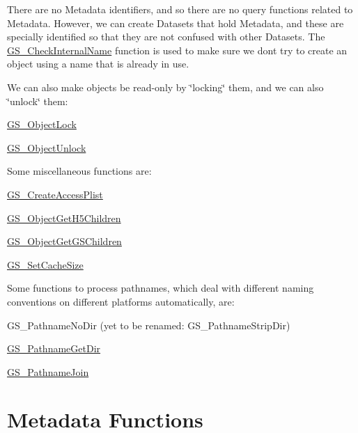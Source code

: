 There are no Metadata identifiers, and so there are no query functions related to Metadata. However, we can create Datasets that hold Metadata, and these are specially identified so that they are not confused with other Datasets. The \hyperlink{hdf5mine_8h_a68b26302ddaf7ffd9bf946087e682730}{G\+S\+\_\+\+Check\+Internal\+Name} function is used to make sure we don\textquotesingle{}t try to create an object using a name that is already in use.

We can also make objects be read-\/only by \char`\"{}locking\char`\"{} them, and we can also \char`\"{}unlock\char`\"{} them\+: \begin{DoxyItemize}
\item \hyperlink{hdf5mine_8h_GS_ObjectLock}{G\+S\+\_\+\+Object\+Lock} \item \hyperlink{hdf5mine_8h_GS_ObjectUnlock}{G\+S\+\_\+\+Object\+Unlock}\end{DoxyItemize}
Some miscellaneous functions are\+: \begin{DoxyItemize}
\item \hyperlink{hdf5mine_8h_a34fb1b133fb3242cc26df4e106327527}{G\+S\+\_\+\+Create\+Access\+Plist} \item \hyperlink{hdf5mine_8h_a812489b44e4180a8af78956ab46d46ff}{G\+S\+\_\+\+Object\+Get\+H5\+Children} \item \hyperlink{hdf5mine_8h_a19e538d571889073e925419460f8773a}{G\+S\+\_\+\+Object\+Get\+G\+S\+Children} \item \hyperlink{hdf5mine_8h_a13f56a548b4aae09f8ac914f72a7352f}{G\+S\+\_\+\+Set\+Cache\+Size}\end{DoxyItemize}
Some functions to process pathnames, which deal with different naming conventions on different platforms automatically, are\+: \begin{DoxyItemize}
\item G\+S\+\_\+\+Pathname\+No\+Dir (yet to be renamed\+: G\+S\+\_\+\+Pathname\+Strip\+Dir) \item \hyperlink{hdf5mine_8h_a6d72093c09d6975d8e2d93d54a714731}{G\+S\+\_\+\+Pathname\+Get\+Dir} \item \hyperlink{hdf5mine_8h_abe4277ed46863da90a4fdf7ee2ec35b9}{G\+S\+\_\+\+Pathname\+Join}\end{DoxyItemize}
\hypertarget{hdf_library_object_metadata_functions}{}\section{Metadata Functions}\label{hdf_library_object_metadata_functions}

